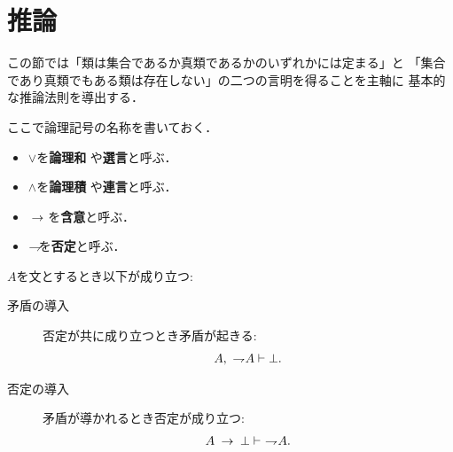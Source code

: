 \section{推論}
	この節では「類は集合であるか真類であるかのいずれかには定まる」と
	「集合であり真類でもある類は存在しない」の二つの言明を得ることを主軸に
	基本的な推論法則を導出する．
	
	ここで論理記号の名称を書いておく．
	\begin{itemize}
		\item $\vee$を{\bf 論理和}
			や{\bf 選言}と呼ぶ．
		\item $\wedge$を{\bf 論理積}
			や{\bf 連言}と呼ぶ．
		\item $\hspace{0.25em}\rightarrow\hspace{0.25em}$を{\bf 含意}と呼ぶ．
		\item $\rightharpoondown\hspace{-0.25em}$を{\bf 否定}と呼ぶ．
	\end{itemize}
	
	\begin{screen}
		\begin{logicalaxm}[否定と矛盾に関する規則]
		\label{logicalaxm:rules_of_negation_and_contradiction}
			$A$を文とするとき以下が成り立つ:
			\begin{description}
				\item[矛盾の導入] 否定が共に成り立つとき矛盾が起きる:
					\begin{align}
						A,\ \rightharpoondown\hspace{-0.25em} A \vdash \bot.
					\end{align}
				\item[否定の導入] 矛盾が導かれるとき否定が成り立つ:
					\begin{align}
						A \hspace{0.25em}\rightarrow\hspace{0.25em} \bot \vdash\ \rightharpoondown\hspace{-0.25em} A.
					\end{align}
			\end{description}
		\end{logicalaxm}
	\end{screen}
	
